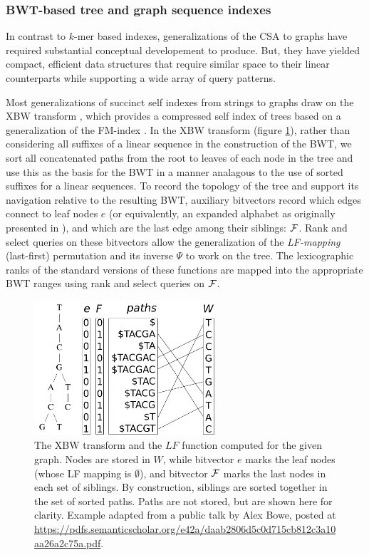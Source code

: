 \subsubsection{BWT-based tree and graph sequence indexes}

In contrast to $k$-mer based indexes, generalizations of the CSA to graphs have required substantial conceptual developement to produce.
But, they have yielded compact, efficient data structures that require similar space to their linear counterparts while supporting a wide array of query patterns.

Most generalizations of succinct self indexes from strings to graphs draw on the XBW transform \cite{ferragina2005structuring}, which provides a compressed self index of trees based on a generalization of the FM-index \cite{ferragina2009compressing}.
In the XBW transform (figure \ref{fig:xbw}), rather than considering all suffixes of a linear sequence in the construction of the BWT, we sort all concatenated paths from the root to leaves of each node in the tree and use this as the basis for the BWT in a manner analagous to the use of sorted suffixes for a linear sequences.
To record the topology of the tree and support its navigation relative to the resulting BWT, auxiliary bitvectors record which edges connect to leaf nodes $e$ (or equivalently, an expanded alphabet as originally presented in \cite{ferragina2005structuring}), and which are the last edge among their siblings: ${\cal F}$.
Rank and select queries on these bitvectors allow the generalization of the \emph{LF-mapping} (last-first) permutation and its inverse $\Psi$ to work on the tree.
The lexicographic ranks of the standard versions of these functions are mapped into the appropriate BWT ranges using rank and select queries on ${\cal F}$.


\begin{figure}[htbp!]
  \centering
  \includegraphics[width=0.6\textwidth]{Chapter2/Figs/xbw_viz.pdf}
  \caption[The XBW transform]{
    The XBW transform and the $LF$ function computed for the given graph.
    Nodes are stored in $W$, while bitvector $e$ marks the leaf nodes (whose LF mapping is $\emptyset$), and bitvector ${\cal F}$ marks the last nodes in each set of siblings.
    By construction, siblings are sorted together in the set of sorted paths.
    Paths are not stored, but are shown here for clarity.
    Example adapted from a public talk by Alex Bowe, posted at \url{https://pdfs.semanticscholar.org/e42a/daab2806d5c0d715cb812c3a10aa26a2c75a.pdf}.
  }
  \label{fig:xbw}
\end{figure}


